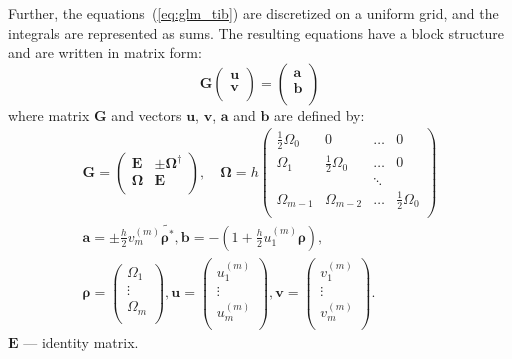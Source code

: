 Further, the equations~(\ref{eq:glm_tib}) are discretized on a uniform grid, and the integrals are represented as sums.
The resulting equations have a block structure and are written in matrix form:
\begin{equation}
    \mathbf{G}
    \begin{pmatrix}
        \mathbf{u} \\
        \mathbf{v} \\
    \end{pmatrix} =
    \begin{pmatrix}
        \mathbf{a} \\
        \mathbf{b} \\
    \end{pmatrix}
\end{equation}
where matrix $\mathbf{G}$ and vectors $\mathbf{u}$, $\mathbf{v}$, $\mathbf{a}$ and $\mathbf{b}$
are defined by:
\begin{eqnarray}
    \mathbf{G} = 
    \begin{pmatrix}
        \mathbf{E} & \pm \mathbf{\Omega}^{\dagger} \\
        \mathbf{\Omega} & \mathbf{E} \\
    \end{pmatrix} {,}
    \quad
    \mathbf{\Omega} = h
    \begin{pmatrix}
        \frac{1}{2} \Omega_0 & 0 & \dots & 0 \\
        \Omega_1 & \frac{1}{2} \Omega_0 & \dots & 0 \\
        & & \ddots & \\
        \Omega_{m-1} & \Omega_{m-2} & \dots & \frac{1}{2} \Omega_0 \\
    \end{pmatrix} 
    \nonumber \\ 
    \mathbf{a} = \pm \frac{h}{2} v_m^{(m)} \tilde{\mathbf{\rho}^{*}} {,}
    \mathbf{b} = - \left( 1 + \frac{h}{2} u_1^{(m)} \mathbf{\rho} \right) {,} 
    \nonumber \\
    \mathbf{\rho} = 
    \begin{pmatrix}
        \Omega_1 \\
        \vdots \\
        \Omega_m \\
    \end{pmatrix} {,}
    \mathbf{u} = 
    \begin{pmatrix}
        u_1^{(m)} \\
        \vdots \\
        u_m^{(m)} \\
    \end{pmatrix} {,}
    \mathbf{v} =
    \begin{pmatrix}
        v_1^{(m)} \\
        \vdots \\
        v_m^{(m)} \\
    \end{pmatrix} {.}
\end{eqnarray}
$\mathbf{E}$ --- identity matrix.

